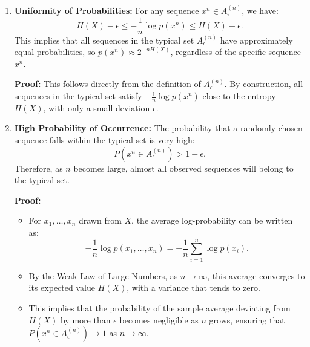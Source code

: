 \begin{enumerate}
    \item \textbf{Uniformity of Probabilities:} For any sequence $x^n \in A^{(n)}_\epsilon$, we have:
          \[
              H(X) - \epsilon \leq -\frac{1}{n} \log p(x^n) \leq H(X) + \epsilon.
          \]
          This implies that all sequences in the typical set $A_\epsilon^{(n)}$ have approximately equal probabilities, so $p(x^n) \approx 2^{-nH(X)}$, regardless of the specific sequence $x^n$.

          \textbf{Proof:} This follows directly from the definition of $A^{(n)}_\epsilon$. By construction, all sequences in the typical set satisfy $-\frac{1}{n} \log p(x^n)$ close to the entropy $H(X)$, with only a small deviation $\epsilon$.

    \item \textbf{High Probability of Occurrence:} The probability that a randomly chosen sequence falls within the typical set is very high:
          \[
              P(x^n \in A^{(n)}_\epsilon) > 1 - \epsilon.
          \]
          Therefore, as $n$ becomes large, almost all observed sequences will belong to the typical set.

          \textbf{Proof:}
          \begin{itemize}
              \item For $x_1, \dots, x_n$ drawn from $X$, the average log-probability can be written as:
                    \[
                        -\frac{1}{n} \log p(x_1, \dots, x_n) = -\frac{1}{n} \sum_{i=1}^n \log p(x_i).
                    \]
              \item By the Weak Law of Large Numbers, as $n \to \infty$, this average converges to its expected value $H(X)$, with a variance that tends to zero.
              \item This implies that the probability of the sample average deviating from $H(X)$ by more than $\epsilon$ becomes negligible as $n$ grows, ensuring that $P(x^n \in A^{(n)}_\epsilon) \to 1$ as $n \to \infty$.
          \end{itemize}


\end{enumerate}
